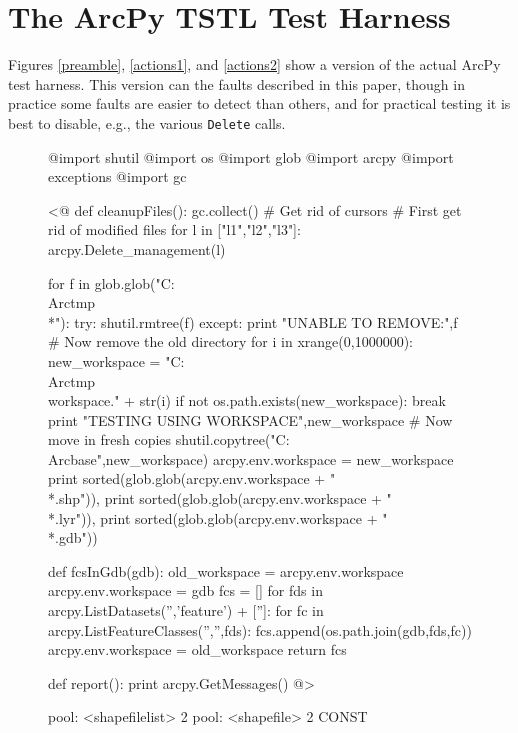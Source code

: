 \section{The ArcPy TSTL Test Harness}

Figures \ref{preamble}, \ref{actions1}, and \ref{actions2} show a
version of the actual ArcPy test harness.  This version can the faults
described in this paper, though in practice some faults are easier to
detect than others, and for practical testing it is best to disable,
e.g., the various {\tt Delete} calls.  

\begin{figure}
{\scriptsize
\begin{code}
@import shutil
@import os
@import glob
@import arcpy
@import exceptions
@import gc

<@
def cleanupFiles():
    gc.collect() \# Get rid of cursors
    \# First get rid of modified files
    for l in ["l1","l2","l3"]:
    	arcpy.Delete\_management(l)
    
    for f in glob.glob("C:\\Arctmp\\*"):
        try:
            shutil.rmtree(f)
        except:
            print "UNABLE TO REMOVE:",f
    \# Now remove the old directory
    for i in xrange(0,1000000):
        new\_workspace = "C:\\Arctmp\\workspace." + str(i)
        if not os.path.exists(new\_workspace):
            break             
    print "TESTING USING WORKSPACE",new\_workspace
    \# Now move in fresh copies
    shutil.copytree("C:\\Arcbase",new\_workspace)
    arcpy.env.workspace = new\_workspace
    print sorted(glob.glob(arcpy.env.workspace + "\\*.shp")),
    print sorted(glob.glob(arcpy.env.workspace + "\\*.lyr")),
    print sorted(glob.glob(arcpy.env.workspace + "\\*.gdb"))


def fcsInGdb(gdb):
    old\_workspace = arcpy.env.workspace
    arcpy.env.workspace = gdb
    fcs = []
    for fds in arcpy.ListDatasets('','feature') + ['']:
        for fc in arcpy.ListFeatureClasses('','',fds):
            fcs.append(os.path.join(gdb,fds,fc))
    arcpy.env.workspace = old\_workspace
    return fcs

def report():
    print arcpy.GetMessages()
@>

pool: <shapefilelist> 2
pool: <shapefile> 2 CONST


\end{code}}
\end{figure}
